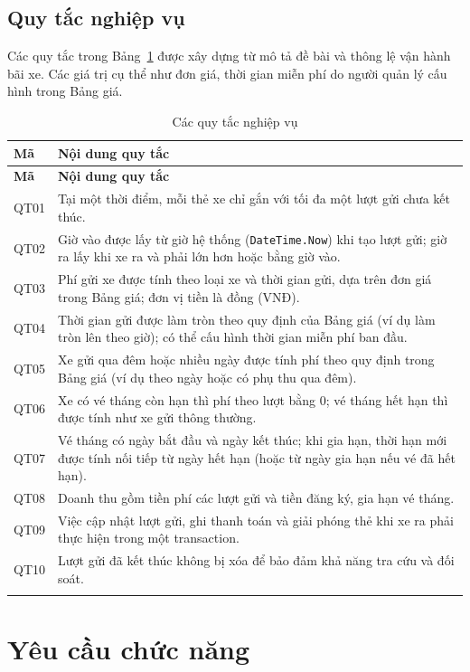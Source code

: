 \subsection{Quy tắc nghiệp vụ}

Các quy tắc trong Bảng~\ref{tab:quytac} được xây dựng từ mô tả đề bài và thông lệ vận hành bãi xe. Các giá trị cụ thể như đơn giá, thời gian miễn phí do người quản lý cấu hình trong Bảng giá.

\begin{longtable}{@{}l p{13.3cm}@{}}
  \toprule
  \textbf{Mã} & \textbf{Nội dung quy tắc} \\
  \midrule
  \endfirsthead
  \toprule
  \textbf{Mã} & \textbf{Nội dung quy tắc} \\
  \midrule
  \endhead
  QT01 & Tại một thời điểm, mỗi thẻ xe chỉ gắn với tối đa một lượt gửi chưa kết thúc. \\
  QT02 & Giờ vào được lấy từ giờ hệ thống (\texttt{DateTime.Now}) khi tạo lượt gửi; giờ ra lấy khi xe ra và phải lớn hơn hoặc bằng giờ vào. \\
  QT03 & Phí gửi xe được tính theo loại xe và thời gian gửi, dựa trên đơn giá trong Bảng giá; đơn vị tiền là đồng (VNĐ). \\
  QT04 & Thời gian gửi được làm tròn theo quy định của Bảng giá (ví dụ làm tròn lên theo giờ); có thể cấu hình thời gian miễn phí ban đầu. \\
  QT05 & Xe gửi qua đêm hoặc nhiều ngày được tính phí theo quy định trong Bảng giá (ví dụ theo ngày hoặc có phụ thu qua đêm). \\
  QT06 & Xe có vé tháng còn hạn thì phí theo lượt bằng 0; vé tháng hết hạn thì được tính như xe gửi thông thường. \\
  QT07 & Vé tháng có ngày bắt đầu và ngày kết thúc; khi gia hạn, thời hạn mới được tính nối tiếp từ ngày hết hạn (hoặc từ ngày gia hạn nếu vé đã hết hạn). \\
  QT08 & Doanh thu gồm tiền phí các lượt gửi và tiền đăng ký, gia hạn vé tháng. \\
  QT09 & Việc cập nhật lượt gửi, ghi thanh toán và giải phóng thẻ khi xe ra phải thực hiện trong một transaction. \\
  QT10 & Lượt gửi đã kết thúc không bị xóa để bảo đảm khả năng tra cứu và đối soát. \\
  \bottomrule
  \caption{Các quy tắc nghiệp vụ}\label{tab:quytac}\\
\end{longtable}

\section{Yêu cầu chức năng}

